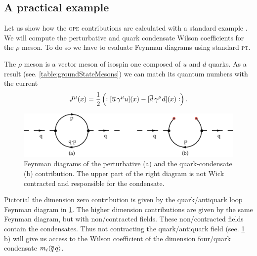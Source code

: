 \documentclass[../../index.tex]{subfiles}
\begin{document}
\subsection{A practical example}
Let us show how the \textsc{ope} contributions are calculated with a standard
example \cite{Shifman1978, Pascual1984}. We will compute the perturbative and
quark condensate Wilson coefficients for the \(\rho\) meson. To do so we have to
evaluate Feynman diagrams using standard \textsc{pt}.

The \(\rho\) meson is a vector meson of isospin one composed of \(u\) and \(d\)
quarks. As a result (see. \cref{table:groundStateMesons}) we can match its
quantum numbers with the current
\begin{equation}
  J^\mu(x) = \frac{1}{2}\left(:[\overline{u}\, \gamma^\mu u](x) - [\overline{d}\, \gamma^\mu d](x):\right).
\end{equation}
\begin{figure}
  \centering
  \includegraphics[width=\textwidth]{./images/condensateFeynmanDiagram.eps}
  \caption{Feynman diagrams of the perturbative (a) and the quark-condensate (b)
    contribution. The upper part of the right diagram is not Wick contracted and
    responsible for the condensate.}
  \label{fig:OPEFeynmanDiagram}
\end{figure}
Pictorial the dimension zero contribution is given by the quark\-/antiquark loop
Feynman diagram in \cref{fig:OPEFeynmanDiagram}. The higher dimension
contributions are given by the same Feynman diagram, but with non\-/contracted
fields. These non\-/contracted fields contain the condensates. Thus not
contracting the quark\-/antiquark field (see. \cref{fig:OPEFeynmanDiagram} b)
will give us access to the Wilson coefficient of the dimension four\-/quark
condensate \(m_i \langle \overline{q}\,q \rangle\).
\end{document}
